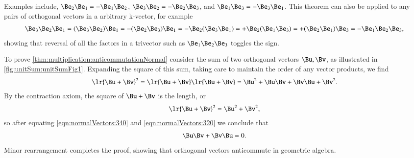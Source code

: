 %
%

Examples include,
\( \Be_2 \Be_1 = -\Be_1 \Be_2 \),
\( \Be_3 \Be_2 = -\Be_2 \Be_3 \), and
\( \Be_1 \Be_3 = -\Be_3 \Be_1 \).  This theorem can also be applied to any pairs of orthogonal vectors in a arbitrary k-vector, for example
\begin{dmath}\label{eqn:normalVectors:300}
\Be_3 \Be_2 \Be_1
= (\Be_3 \Be_2) \Be_1
= -(\Be_2 \Be_3) \Be_1
= -\Be_2 (\Be_3 \Be_1)
= +\Be_2 (\Be_1 \Be_3)
= +(\Be_2 \Be_1) \Be_3
= -\Be_1 \Be_2 \Be_3,
\end{dmath}
showing that reversal of all the factors in a trivector such as \( \Be_1 \Be_2 \Be_3 \) toggles the sign.

To prove \cref{thm:multiplication:anticommutationNormal} consider the 
sum of two orthogonal vectors \( \Bu, \Bv \), as illustrated in \cref{fig:unitSum:unitSumFig1}.  Expanding the square
of this sum, taking care to maintain the order of any vector products, we find
\begin{dmath}\label{eqn:normalVectors:340}
\lr{ \Bu + \Bv }^2 =
\lr{ \Bu + \Bv }
\lr{ \Bu + \Bv }
=
\Bu^2 + \Bu \Bv + \Bv \Bu + \Bv^2.
\end{dmath}
By the contraction axiom, the square of \( \Bu + \Bv \) is the length, or
\begin{dmath}\label{eqn:normalVectors:320}
\lr{ \Bu + \Bv }^2 = \Bu^2 + \Bv^2,
\end{dmath}
so after equating 
\cref{eqn:normalVectors:340}
and 
\cref{eqn:normalVectors:320}
we conclude that
\begin{dmath}\label{eqn:normalVectors:n}
\Bu \Bv + \Bv \Bu = 0.
\end{dmath}
Minor rearrangement completes the proof, showing that orthogonal vectors anticommute in geometric algebra.
